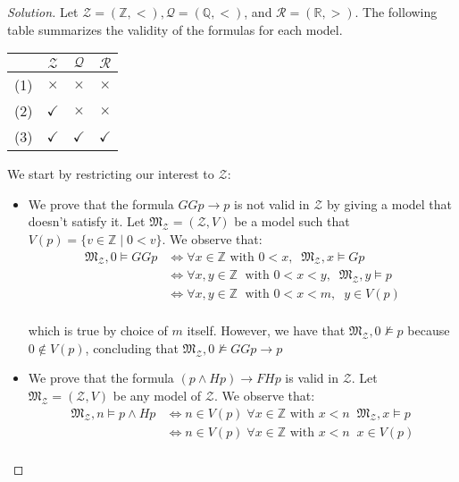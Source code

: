 \documentclass[12pt,a4paper]{report}
\theoremstyle{definition}
\newcommand{\Z}{\mathbb{Z}}                     %
\newcommand{\Q}{\mathbb{Q}}                     %
\newcommand{\R}{\mathbb{R}}                     %
\newcommand{\model}[1]{\mathfrak{#1}}           %
\begin{document}
    \begin{proof}[Solution]
        Let $\mathcal{Z} = (\Z, <), \mathcal{Q} = (\Q, <)$, and $\mathcal{R} = (\R, >)$. The following table summarizes the validity of the formulas for each model.
        \begin{center}
            \begin{tabular}{c|ccc}
                & $\mathcal{Z}$ & $\mathcal{Q}$ & $\mathcal{R}$ \\
                \hline
                (1) & $\times$ & $\times$ & $\times$ \\
                (2) & $\checkmark$ & $\times$ & $\times$ \\
                (3) & $\checkmark$ & $\checkmark$ & $\checkmark$ \\
            \end{tabular}
        \end{center}
        
        We start by restricting our interest to $\mathcal{Z}$:
        \begin{itemize}
            \item We prove that the formula $GGp \to p$ is not valid in $\mathcal{Z}$ by giving a model that doesn't satisfy it. Let $\model{M}_{\mathcal{Z}} = (\mathcal{Z}, V)$ be a model such that $V(p) = \{v \in \Z \mid 0 < v\}$. We observe that:
            \[\begin{split}
                \model{M}_{\mathcal{Z}}, 0 \models GGp & \iff \forall x \in \Z \text{ with } 0 < x, \;\; \model{M}_{\mathcal{Z}}, x \models Gp \\
                & \iff \forall x,y  \in \Z \; \text{ with } 0 < x < y, \;\; \model{M}_{\mathcal{Z}}, y \models p \\ 
                & \iff \forall x,y \in \Z \; \text{ with } 0 < x < m, \;\; y \in V(p) \\ 
            \end{split}\]

            which is true by choice of $m$ itself. However, we have that $\model{M}_{\mathcal{Z}}, 0 \not\models p$ because $0 \notin V(p)$, concluding that $\model{M}_{\mathcal{Z}}, 0 \not\models GGp \to p$

            \item We prove that the formula $(p \land Hp) \to FHp$ is valid in $\mathcal{Z}$. Let $\model{M}_{\mathcal{Z}} = (\mathcal{Z}, V)$ be any model of $\mathcal{Z}$. We observe that:
            \[\begin{split}
                \model{M}_{\mathcal{Z}}, n \models p \land Hp & \iff n \in V(p) \; \forall x \in \Z \text{ with } x < n \;\; \model{M}_{\mathcal{Z}}, x \models p \\
                & \iff n \in V(p) \; \forall x \in \Z \text{ with } x < n \;\; x \in V(p) \\
            \end{split}\]
            

\end{itemize}
\end{proof}
\end{document}
